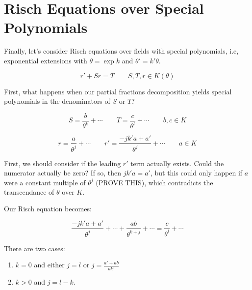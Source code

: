 
\vfill\eject
\section{Risch Equations over Special Polynomials}

Finally, let's consider Risch equations over fields
with special polynomials, i.e, exponential extensions
with $\theta = \exp k$ and $\theta' = k' \theta$.

$$r' + S r = T \qquad S,T,r \in K(\theta)$$

First, what happens when our partial
fractions decomposition yields special polynomials
in the denominators of $S$ or $T$?

$$S = \frac{b}{\theta^k} + \cdots \qquad T = \frac{c}{\theta^l} + \cdots \qquad b,c \in K$$




$$r = \frac{a}{\theta^j} + \cdots  \qquad  r' = \frac{-j k' a + a'}{\theta^{j}} + \cdots \qquad a \in K$$

First, we should consider if the leading $r'$ term actually exists.
Could the numerator actually be zero?  If so, then $j k' a = a'$,
but this could only happen if $a$ were a constant
multiple of $\theta^j$ (PROVE THIS), which contradicts the
transcendance of $\theta$ over $K$.

Our Risch equation becomes:

$$\frac{-j k' a + a'}{\theta^{j}} + \cdots + \frac{a b }{\theta^{k+j}} + \cdots
= \frac{c}{\theta^l} + \cdots$$

There are two cases:

\begin{enumerate}
\item $k=0$ and either $j=l$ or
$j = $
\item $k>0$ and $j=l-k$.
\end{enumerate}

